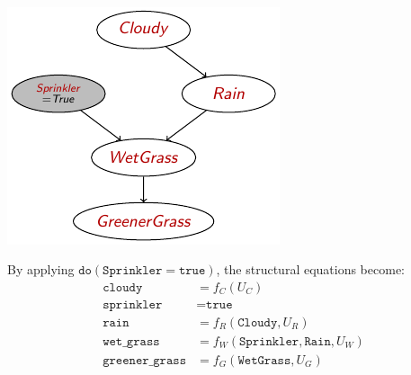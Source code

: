 \begin{description}
        \begin{example} \phantom{}\\[0.5em]
            \begin{minipage}{.3\linewidth}
                \centering
                \includegraphics[width=\linewidth]{img/_do_operator_example1.pdf}
            \end{minipage}
            \begin{minipage}{.65\linewidth}
                By applying $\texttt{do}(\texttt{Sprinkler} = \texttt{true})$, the structural equations become:
                \[ 
                    \begin{split}
                        \texttt{cloudy} &= f_C(U_C) \\
                        \texttt{sprinkler} &= \texttt{true} \\
                        \texttt{rain} &= f_R(\texttt{Cloudy}, U_R) \\
                        \texttt{wet\_grass} &= f_W(\texttt{Sprinkler}, \texttt{Rain}, U_W) \\
                        \texttt{greener\_grass} &= f_G(\texttt{WetGrass}, U_G)
                    \end{split}
                \]
            \end{minipage}\\[0.5em]


\end{example}
\end{description}
